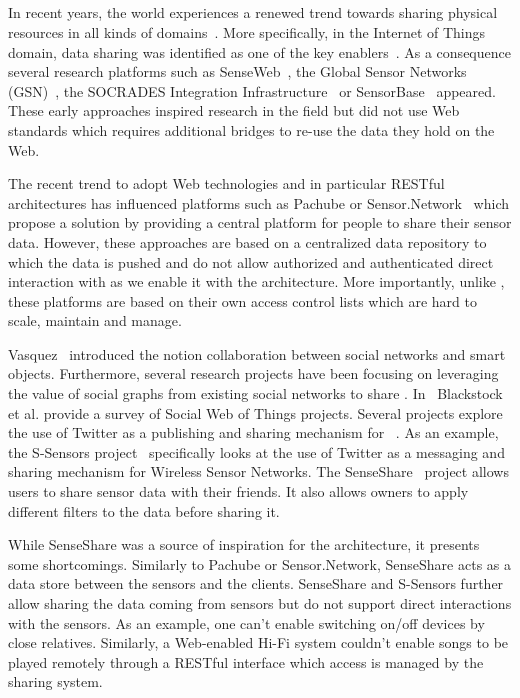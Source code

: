 \subsection{\shareLayer{}}
In recent years, the world experiences a renewed trend towards sharing physical resources in all kinds of domains~\cite{Botsman2010}. More specifically, in the Internet of Things domain, data sharing was identified as one of the key enablers~\cite{Vazquez2008,Blackstock2011}. As a consequence several research platforms such as SenseWeb~\cite{Grosky2007,Luo2008}, the Global Sensor Networks (GSN)~\cite{Aberer2007}, the SOCRADES Integration Infrastructure~\cite{DeSouza2008} or SensorBase~\cite{Chen2007} appeared. These early approaches inspired research in the field but did not use Web standards which requires additional bridges to re-use the data they hold on the Web.

The recent trend to adopt Web technologies and in particular RESTful architectures has influenced platforms such as Pachube or Sensor.Network~\cite{Gupta2010} which propose a solution by providing a central platform for people to share their sensor data. However, these approaches are based on a centralized data repository to which the data is pushed and do not allow authorized and authenticated direct interaction with \sts{} as we enable it with the \sacLong{} architecture. More importantly, unlike \sac{}, these platforms are based on their own access control lists which are hard to scale, maintain and manage.

Vasquez~\cite{Vazquez2008} introduced the notion collaboration between social networks and smart objects. Furthermore, several research projects have been focusing on leveraging the value of social graphs from existing social networks to share \sts{}. In~\cite{Blackstock2011} Blackstock et al. provide a survey of Social Web of Things projects. Several projects explore the use of Twitter as a publishing and sharing mechanism for \sts{}~. As an example, the S-Sensors project~\cite{Baqer2009} specifically looks at the use of Twitter as a messaging and sharing mechanism for Wireless Sensor Networks. The SenseShare~\cite{Schmid2007} project allows users to share sensor data with their friends. It also allows owners to apply different filters to the data before sharing it. 

While SenseShare was a source of inspiration for the \sac{} architecture, it presents some shortcomings. Similarly to Pachube or Sensor.Network, SenseShare acts as a data store between the sensors and the clients. SenseShare and S-Sensors further allow sharing the data coming from sensors but do not support direct interactions with the sensors. As an example, one can't enable switching on/off devices by close relatives. Similarly, a Web-enabled Hi-Fi system couldn't enable songs to be played remotely through a RESTful interface which access is managed by the sharing system.

